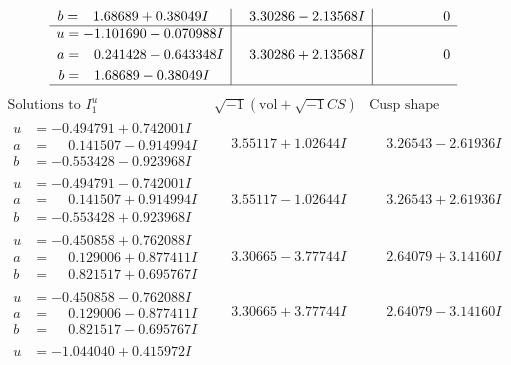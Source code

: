 \documentclass[1p]{elsarticle_modified}
\theoremstyle{definition}
\newcommand{\I}{\sqrt{-1}}
\begin{document}
$$\begin{array}{c|c|c}
\begin{aligned}
b &= \phantom{-}1.68689 + 0.38049 I\end{aligned}
 & \phantom{-}3.30286 - 2.13568 I & \phantom{-0.000000 } 0 \\ \hline\begin{aligned}
u &= -1.101690 - 0.070988 I \\
a &= \phantom{-}0.241428 - 0.643348 I \\
b &= \phantom{-}1.68689 - 0.38049 I\end{aligned}
 & \phantom{-}3.30286 + 2.13568 I & \phantom{-0.000000 } 0\\
 \hline 
 \end{array}$$\newpage$$\begin{array}{c|c|c}  
\text{Solutions to }I^u_{1}& \I (\text{vol} + \sqrt{-1}CS) & \text{Cusp shape}\\
 \hline 
\begin{aligned}
u &= -0.494791 + 0.742001 I \\
a &= \phantom{-}0.141507 - 0.914994 I \\
b &= -0.553428 - 0.923968 I\end{aligned}
 & \phantom{-}3.55117 + 1.02644 I & \phantom{-}3.26543 - 2.61936 I \\ \hline\begin{aligned}
u &= -0.494791 - 0.742001 I \\
a &= \phantom{-}0.141507 + 0.914994 I \\
b &= -0.553428 + 0.923968 I\end{aligned}
 & \phantom{-}3.55117 - 1.02644 I & \phantom{-}3.26543 + 2.61936 I \\ \hline\begin{aligned}
u &= -0.450858 + 0.762088 I \\
a &= \phantom{-}0.129006 + 0.877411 I \\
b &= \phantom{-}0.821517 + 0.695767 I\end{aligned}
 & \phantom{-}3.30665 - 3.77744 I & \phantom{-}2.64079 + 3.14160 I \\ \hline\begin{aligned}
u &= -0.450858 - 0.762088 I \\
a &= \phantom{-}0.129006 - 0.877411 I \\
b &= \phantom{-}0.821517 - 0.695767 I\end{aligned}
 & \phantom{-}3.30665 + 3.77744 I & \phantom{-}2.64079 - 3.14160 I \\ \hline\begin{aligned}
u &= -1.044040 + 0.415972 I \\

\end{aligned}
\end{array}$$
\end{document}
